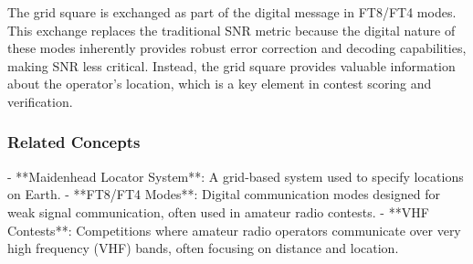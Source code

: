 The grid square is exchanged as part of the digital message in FT8/FT4 modes. This exchange replaces the traditional SNR metric because the digital nature of these modes inherently provides robust error correction and decoding capabilities, making SNR less critical. Instead, the grid square provides valuable information about the operator's location, which is a key element in contest scoring and verification.

\subsubsection*{Related Concepts}
- **Maidenhead Locator System**: A grid-based system used to specify locations on Earth.
- **FT8/FT4 Modes**: Digital communication modes designed for weak signal communication, often used in amateur radio contests.
- **VHF Contests**: Competitions where amateur radio operators communicate over very high frequency (VHF) bands, often focusing on distance and location.


